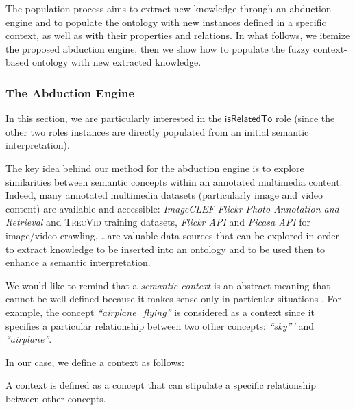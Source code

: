 			The population process aims to extract new knowledge through an abduction engine and to populate the 
			ontology with new instances defined in a specific context, 
			as well as with their properties and relations. In what follows, we itemize the proposed abduction engine, 
			then we show how to populate the fuzzy context-based ontology with new extracted knowledge.

		\subsubsection{The Abduction Engine}

			In this section, we are particularly interested in the 
			$\mathsf{isRelatedTo}$ role (since the other two roles instances are directly populated 
			from an initial semantic interpretation).

			The key idea behind our method for the abduction engine is to explore similarities 
			between semantic concepts within an annotated multimedia content. Indeed, many annotated 
			multimedia datasets (particularly image and video content) are available and accessible:  
			\emph{ImageCLEF Flickr Photo Annotation and Retrieval} \citep{Thomee2012} and \textsc{TrecVid}  
			\citep{Over2013} training datasets, \emph{Flickr API} and \emph{Picasa API} for image/video 
			crawling, \dots are valuable data sources that can be explored in order to extract knowledge 
			to be inserted into an ontology and to be used then to enhance a semantic interpretation.


			We would like to remind that a \emph{semantic context} is an abstract meaning that cannot be well defined because 
			it makes sense only in particular situations \citep{Elleuch2011, Ksentini2012}. 
			For example, the concept \emph{``airplane\_{}flying''} is considered as
			a context since it specifies a particular relationship between two other
			concepts: \emph{``sky'''} and \emph{``airplane''}. 

			In our case, we define a context as follows:
			\begin{definition} 
				A context is defined as a concept that can stipulate a specific relationship 
				between other concepts.
			\end{definition}

